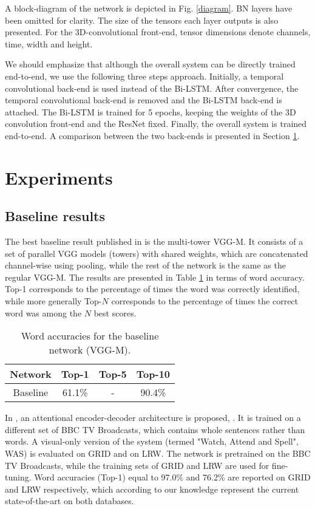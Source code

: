 \documentclass[a4paper]{article}
\begin{document}
A block-diagram of the network is depicted in Fig. \ref{diagram}. BN layers have been omitted for clarity. The size of the tensors each layer outputs is also presented. For the 3D-convolutional front-end, tensor dimensions denote channels, time, width and height. 

We should emphasize that although the overall system can be directly trained end-to-end, we use the following three steps approach. Initially, a temporal convolutional back-end is used instead of the Bi-LSTM. After convergence, the temporal convolutional back-end is removed and the Bi-LSTM back-end is attached. The Bi-LSTM is trained for 5 epochs, keeping the weights of the 3D convolution front-end and the ResNet fixed. Finally, the overall system is trained end-to-end. A comparison between the two back-ends is presented in Section \ref{Exper}.      

\section{Experiments}
\label{Exper}
\subsection{Baseline results}
The best baseline result published in \cite{chung2016lip} is the multi-tower VGG-M. It consists of a set of parallel VGG models (towers) with shared weights, which are concatenated channel-wise using pooling, while the rest of the network is the same as the regular VGG-M. The results are presented in Table \ref{baseline} in terms of word accuracy. Top-1 corresponds to the percentage of times the word was correctly identified, while more generally Top-$N$ corresponds to the percentage of times the correct word was among the $N$ best scores.

\begin{table}[!htbp]
\centering
\begin{tabular}{| c || c | c | c |} 
\hline
Network & Top-1 & Top-5 & Top-10 \\ [0.5ex] 
\hline
Baseline & 61.1\% & - & 90.4\% \\ 
\hline
\end{tabular}
\vspace{1mm}\caption{Word accuracies for the baseline network (VGG-M).}\label{baseline}
\end{table}

In \cite{chung2016lipsent}, an attentional encoder-decoder architecture is proposed, \cite{xu2015show}. It is trained on a different set of BBC TV Broadcasts, which contains whole sentences rather than words. A visual-only version of the system (termed "Watch, Attend and Spell", WAS) is evaluated on GRID and on LRW. The network is pretrained on the BBC TV Broadcasts, while the training sets of GRID and LRW are used for fine-tuning. Word accuracies (Top-1) equal to 97.0\% and 76.2\% are reported on GRID and LRW respectively, which according to our knowledge represent the current state-of-the-art on both databases.
\end{document}
